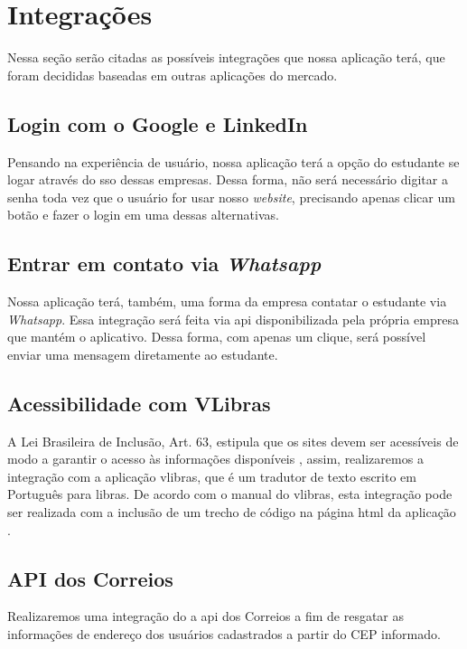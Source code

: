 \section{Integrações}
Nessa seção serão citadas as possíveis integrações que nossa aplicação terá, que foram decididas baseadas em outras aplicações do mercado.

\subsection{Login com o Google e LinkedIn}
Pensando na experiência de usuário, nossa aplicação terá a opção do estudante se logar através do \ac{sso} dessas empresas. Dessa forma, não será necessário digitar a senha toda vez que o usuário for usar nosso \emph{website}, precisando apenas clicar um botão e fazer o login em uma dessas alternativas.

\subsection{Entrar em contato via \emph{Whatsapp}}
Nossa aplicação terá, também, uma forma da empresa contatar o estudante via \emph{Whatsapp}. Essa integração será feita via \ac{api} disponibilizada pela própria empresa que mantém o aplicativo. Dessa forma, com apenas um clique, será possível enviar uma mensagem diretamente ao estudante.

\subsection{Acessibilidade com VLibras}
A Lei Brasileira de Inclusão, Art. 63, estipula que os sites devem ser acessíveis de modo a garantir o acesso às informações disponíveis \cite{leiinclusao}, assim, realizaremos a integração com a aplicação \gls{vlibras}, que é um tradutor de texto escrito em Português para \ac{libras}. De acordo com o manual do \gls{vlibras}, esta integração pode ser realizada com a inclusão de um trecho de código na página \ac{html} da aplicação \cite{manualvlibras}.

\subsection{API dos Correios}
Realizaremos uma integração do a \ac{api} dos Correios a fim de resgatar as informações de endereço dos usuários cadastrados a partir do CEP informado.